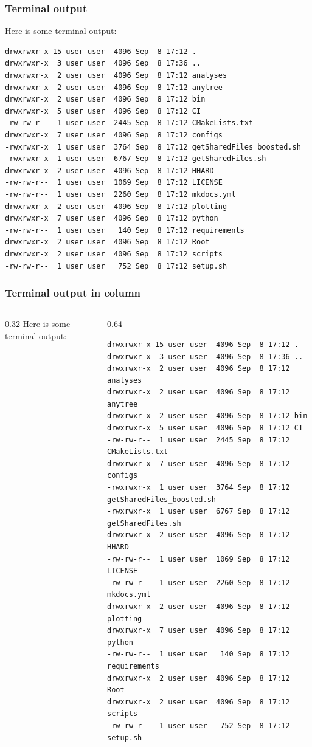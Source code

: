 \begin{frame}[fragile]
\frametitle{Terminal output}
Here is some terminal output:
\begin{verbatim}
drwxrwxr-x 15 user user  4096 Sep  8 17:12 .
drwxrwxr-x  3 user user  4096 Sep  8 17:36 ..
drwxrwxr-x  2 user user  4096 Sep  8 17:12 analyses
drwxrwxr-x  2 user user  4096 Sep  8 17:12 anytree
drwxrwxr-x  2 user user  4096 Sep  8 17:12 bin
drwxrwxr-x  5 user user  4096 Sep  8 17:12 CI
-rw-rw-r--  1 user user  2445 Sep  8 17:12 CMakeLists.txt
drwxrwxr-x  7 user user  4096 Sep  8 17:12 configs
-rwxrwxr-x  1 user user  3764 Sep  8 17:12 getSharedFiles_boosted.sh
-rwxrwxr-x  1 user user  6767 Sep  8 17:12 getSharedFiles.sh
drwxrwxr-x  2 user user  4096 Sep  8 17:12 HHARD
-rw-rw-r--  1 user user  1069 Sep  8 17:12 LICENSE
-rw-rw-r--  1 user user  2260 Sep  8 17:12 mkdocs.yml
drwxrwxr-x  2 user user  4096 Sep  8 17:12 plotting
drwxrwxr-x  7 user user  4096 Sep  8 17:12 python
-rw-rw-r--  1 user user   140 Sep  8 17:12 requirements
drwxrwxr-x  2 user user  4096 Sep  8 17:12 Root
drwxrwxr-x  2 user user  4096 Sep  8 17:12 scripts
-rw-rw-r--  1 user user   752 Sep  8 17:12 setup.sh
\end{verbatim}
\end{frame}

\begin{frame}[fragile]
\frametitle{Terminal output in column}
\begin{columns}[T,onlytextwidth]
\begin{column}{0.32\textwidth}
Here is some terminal output:
\end{column}
\begin{column}{0.64\textwidth}
\begin{verbatim}
drwxrwxr-x 15 user user  4096 Sep  8 17:12 .
drwxrwxr-x  3 user user  4096 Sep  8 17:36 ..
drwxrwxr-x  2 user user  4096 Sep  8 17:12 analyses
drwxrwxr-x  2 user user  4096 Sep  8 17:12 anytree
drwxrwxr-x  2 user user  4096 Sep  8 17:12 bin
drwxrwxr-x  5 user user  4096 Sep  8 17:12 CI
-rw-rw-r--  1 user user  2445 Sep  8 17:12 CMakeLists.txt
drwxrwxr-x  7 user user  4096 Sep  8 17:12 configs
-rwxrwxr-x  1 user user  3764 Sep  8 17:12 getSharedFiles_boosted.sh
-rwxrwxr-x  1 user user  6767 Sep  8 17:12 getSharedFiles.sh
drwxrwxr-x  2 user user  4096 Sep  8 17:12 HHARD
-rw-rw-r--  1 user user  1069 Sep  8 17:12 LICENSE
-rw-rw-r--  1 user user  2260 Sep  8 17:12 mkdocs.yml
drwxrwxr-x  2 user user  4096 Sep  8 17:12 plotting
drwxrwxr-x  7 user user  4096 Sep  8 17:12 python
-rw-rw-r--  1 user user   140 Sep  8 17:12 requirements
drwxrwxr-x  2 user user  4096 Sep  8 17:12 Root
drwxrwxr-x  2 user user  4096 Sep  8 17:12 scripts
-rw-rw-r--  1 user user   752 Sep  8 17:12 setup.sh
\end{verbatim}
\end{column}
\end{columns}
\end{frame}

